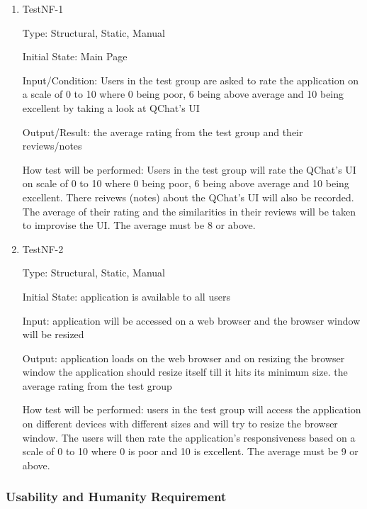 \documentclass[12pt, titlepage]{article}
\begin{document}
\begin{enumerate}

\item{TestNF-1\\}

Type: Structural, Static, Manual

Initial State: Main Page
					
Input/Condition: Users in the test group are asked to rate the application on a scale of 0 to 10 where 0 being poor, 6 being above average and 10 being excellent by taking a look at QChat’s UI
					
Output/Result: the average rating from the test group and their reviews/notes

How test will be performed: Users in the test group will rate the QChat’s UI on scale of 0 to 10 where 0 being poor, 6 being above average and 10 being excellent. There reivews (notes) about the QChat’s UI will also be recorded. The average of their rating and the similarities in their reviews will be taken to improvise the UI. The average must be 8 or above.  

\item{TestNF-2\\}

Type: Structural, Static, Manual
					
Initial State: application is available to all users
					
Input: application will be accessed on a web browser and the browser window will be resized
					
Output: application loads on the web browser and on resizing the browser window the application should resize itself till it hits its minimum size. the average rating from the test group
					
How test will be performed: users in the test group will access the application on different devices with different sizes and will try to resize the browser window. The users will then rate the application’s responsiveness based on a scale of 0 to 10 where 0 is poor and 10 is excellent. The average must be 9 or above. 

\end{enumerate}


\subsubsection{Usability and Humanity Requirement}

\end{document}
